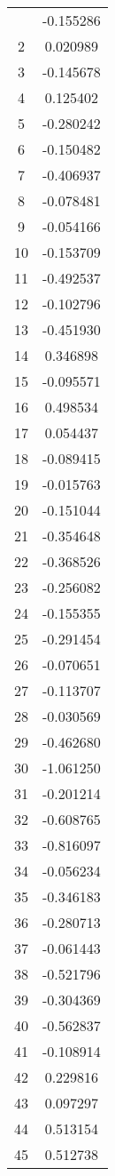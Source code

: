 \documentclass[12pt]{article}
\begin{document}
\begin{longtable}{@{}cc@{}}
\bottomrule
\endlastfoot
1 & -0.155286 \\
2 & 0.020989 \\
3 & -0.145678 \\
4 & 0.125402 \\
5 & -0.280242 \\
6 & -0.150482 \\
7 & -0.406937 \\
8 & -0.078481 \\
9 & -0.054166 \\
10 & -0.153709 \\
11 & -0.492537 \\
12 & -0.102796 \\
13 & -0.451930 \\
14 & 0.346898 \\
15 & -0.095571 \\
16 & 0.498534 \\
17 & 0.054437 \\
18 & -0.089415 \\
19 & -0.015763 \\
20 & -0.151044 \\
21 & -0.354648 \\
22 & -0.368526 \\
23 & -0.256082 \\
24 & -0.155355 \\
25 & -0.291454 \\
26 & -0.070651 \\
27 & -0.113707 \\
28 & -0.030569 \\
29 & -0.462680 \\
30 & -1.061250 \\
31 & -0.201214 \\
32 & -0.608765 \\
33 & -0.816097 \\
34 & -0.056234 \\
35 & -0.346183 \\
36 & -0.280713 \\
37 & -0.061443 \\
38 & -0.521796 \\
39 & -0.304369 \\
40 & -0.562837 \\
41 & -0.108914 \\
42 & 0.229816 \\
43 & 0.097297 \\
44 & 0.513154 \\
45 & 0.512738 \\

\end{longtable}
\end{document}
